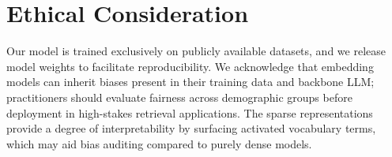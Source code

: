 \section*{Ethical Consideration}

Our model is trained exclusively on publicly available datasets, and we release model weights to facilitate reproducibility.
We acknowledge that embedding models can inherit biases present in their training data and backbone LLM; practitioners should evaluate fairness across demographic groups before deployment in high-stakes retrieval applications.
The sparse representations provide a degree of interpretability by surfacing activated vocabulary terms, which may aid bias auditing compared to purely dense models. 